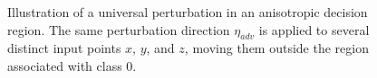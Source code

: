 \begin{figure}[H]
{
    }
    \caption{Illustration of a universal perturbation in an anisotropic decision region.
    The same perturbation direction $\eta_{adv}$ is applied to several distinct input points
    $x$, $y$, and $z$, moving them outside the region associated with class 0.}
    \label{fig:vulnerabilite_universelle_exacte}
\end{figure}
